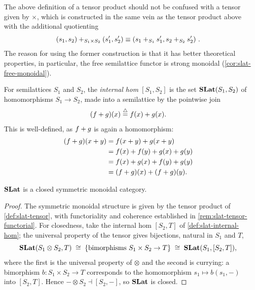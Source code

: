 \begin{remark}
    The above definition of a tensor product should not be confused with a tensor given by $\times$, which is constructed in the same vein as the tensor product above with the additional quotienting
    \[
        (s_1,s_2) +_{S_1 \times S_2} (s_1',s_2') \equiv (s_1 +_{S_1} s_1', s_2 +_{S_2} s_2')~.
    \]
    The reason for using the former construction is that it has better theoretical properties, in particular, the free semilattice functor is strong monoidal (\cref{cor:slat-free-monoidal}).
\end{remark}

\begin{definition}\label{def:slat-internal-hom}
For semilattices $S_1$ and $S_2$, the \emph{internal hom} $[S_1, S_2]$ is the set $\mathbf{SLat}(S_1, S_2)$ of homomorphisms $S_1 \to S_2$, made into a semilattice by the pointwise join
\[
(f + g)(x) \stackrel{\triangle}{=} f(x) + g(x).
\]
This is well-defined, as $f + g$ is again a homomorphism:
\begin{align*}
    (f + g)(x + y) &= f(x + y) + g(x + y)\\
    &= f(x) + f(y) + g(x) + g(y)\\
    &= f(x) + g(x) + f(y) + g(y)\\
    &= (f + g)(x) + (f + g)(y).
\end{align*}
\end{definition}
  \begin{proposition}\label{prop:slat-smcc}
    $\mathbf{SLat}$ is a closed symmetric monoidal category.
  \end{proposition}
  \begin{proof}
    The symmetric monoidal structure is given by the tensor product of \cref{def:slat-tensor}, with functoriality and coherence established in \cref{rem:slat-tensor-functorial}.
    For closedness, take the internal hom $[S_2, T]$ of \cref{def:slat-internal-hom}; the universal property of the tensor gives bijections, natural in $S_1$ and $T$,
    \[
    \mathbf{SLat}(S_1 \otimes S_2, T) \;\cong\; \{\text{bimorphisms } S_1 \times S_2 \to T\} \;\cong\; \mathbf{SLat}(S_1, [S_2, T]),
    \]
    where the first is the universal property of $\otimes$ and the second is currying: a bimorphism $b : S_1 \times S_2 \to T$ corresponds to the homomorphism $s_1 \mapsto b(s_1, -)$ into $[S_2, T]$.
    Hence $- \otimes S_2 \dashv [S_2, -]$, so $\mathbf{SLat}$ is closed.
  \end{proof}

